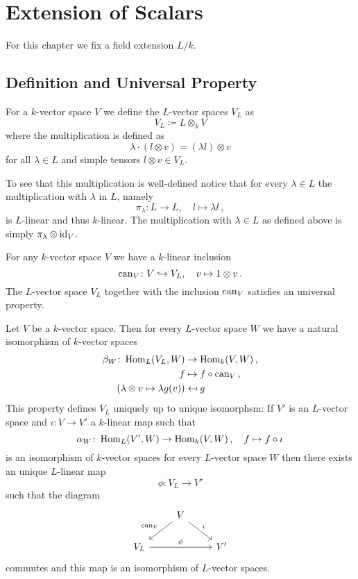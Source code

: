 \chapter{Extension of Scalars}\label{app: extension of scalars}
For this chapter we fix a field extension $L/k$.




\section{Definition and Universal Property}


\begin{definition}
  For a $k$-vector space $V$ we define the $L$-vector spaces $V_L$ as
  \[
    V_L \coloneqq L \otimes_k V
  \]
  where the multiplication is defined as
  \[
      \lambda \cdot (l \otimes v)
    = (\lambda l) \otimes v
  \]
  for all $\lambda \in L$ and simple tensors $l \otimes v \in V_L$.
\end{definition}

To see that this multiplication is well-defined notice that for every $\lambda \in L$ the multiplication with $\lambda$ in $L$, namely
\[
          \pi_\lambda
  \colon  L
  \to     L,
  \quad   l
  \mapsto \lambda l \,,
\]
is $L$-linear and thus $k$-linear.
The multiplication with $\lambda \in L$ as defined above is simply $\pi_\lambda \otimes \operatorname{id}_V$.


For any $k$-vector space $V$ we have a $k$-linear inclusion
\[
                  \operatorname{can}_V
  \colon          V
  \hookrightarrow V_L,
  \quad           v
  \mapsto         1 \otimes v \,.
\]
The $L$-vector space $V_L$ together with the inclusion $\operatorname{can}_V$ satisfies an universal property.


\begin{theorem}
  Let $V$ be a $k$-vector space. Then for every $L$-vector space $W$ we have a natural isomorphism of $k$-vector spaces
  \begin{align*}
              \beta_W
    \colon    \operatorname{Hom}_L(V_L, W)
    &\to      \operatorname{Hom}_k(V,W) \,, \\
              f
    &\mapsto  f \circ \operatorname{can}_V \,,  \\
              ( \lambda \otimes v \mapsto \lambda g(v) )
    &\mapsfrom g
  \end{align*}
  This property defines $V_L$ uniquely up to unique isomorphsm:
  If $V'$ is an $L$-vector space and $\iota \colon V \to V'$ a $k$-linear map such that
  \[
            \alpha_W
    \colon  \operatorname{Hom}_L(V', W)
    \to     \operatorname{Hom}_k(V,W) \,,
    \quad   f
    \mapsto f \circ \iota
  \]
  is an isomorphism of $k$-vector spaces for every $L$-vector space $W$ then there exists an unique $L$-linear map
  \[
    \phi \colon V_L \to V'
  \]
  such that the diagram
  \[
    \begin{tikzcd}
        {}
      & V
        \arrow[swap]{dl}{\can_V}
        \arrow{dr}{\iota}
      & {}
      \\
        V_L
        \arrow{rr}{\phi}
      & {}
      & V'
    \end{tikzcd}
  \]
  commutes and this map is an isomorphism of $L$-vector spaces.
\end{theorem}


